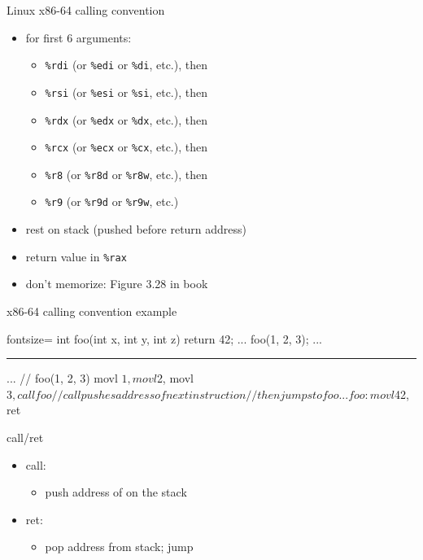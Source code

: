 \begin{frame}{Linux x86-64 calling convention}
    \begin{itemize}
    \item {} for first 6 arguments:
    \begin{itemize}
    \item {\tt \%rdi} (or {\tt \%edi} or {\tt \%di}, etc.), then
    \item {\tt \%rsi} (or {\tt \%esi} or {\tt \%si}, etc.), then
    \item {\tt \%rdx} (or {\tt \%edx} or {\tt \%dx}, etc.), then
    \item {\tt \%rcx} (or {\tt \%ecx} or {\tt \%cx}, etc.), then
    \item {\tt \%r8} (or {\tt \%r8d} or {\tt \%r8w}, etc.), then
    \item {\tt \%r9} (or {\tt \%r9d} or {\tt \%r9w}, etc.)
    \end{itemize}
    \item rest on stack (pushed before return address)
    \item return value in {\tt \%rax}
    \item don't memorize: Figure 3.28 in book
    \end{itemize}
\end{frame}


\begin{frame}[fragile,label=x8664CCExample]{x86-64 calling convention example}
\begin{ccodeNL*}{fontsize=\small}
int foo(int x, int y, int z) { return 42; }
...
    foo(1, 2, 3);
...
\end{ccodeNL*}
\hrule
\begin{asmcodeS}
...
    // foo(1, 2, 3)
    movl $1, %
    movl $2, %
    movl $3, %
    call foo  // call pushes address of next instruction
              // then jumps to foo
...
foo: 
    movl $42, %
    ret
\end{asmcodeS}
\end{frame}

\begin{frame}[fragile,label=stackFrame]{call/ret}
\begin{itemize}
\item call:
    \begin{itemize}
    \item push address of  on the stack
    \end{itemize}
\item ret:
    \begin{itemize}
    \item pop address from stack; jump
    \end{itemize}
\end{itemize}
\end{frame}

